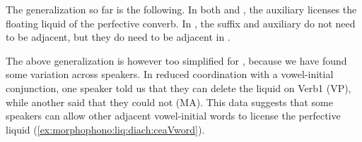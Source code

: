 The generalization so far is the following. In both {\iaIA} and {\seaCEA}, the auxiliary licenses the floating liquid of the perfective converb. In {\iaIA}, the suffix and auxiliary do not need to be adjacent, but they do need to be adjacent in {\seaCEA}.%
%
%	
%			
%			
%		

The above generalization  is however too simplified for   {\seaCEA}, because we have found some variation across speakers. In reduced coordination with a vowel-initial conjunction, one {\seaSE} speaker  told us that they can delete the liquid on Verb1 (VP), while another said that they could not (MA). This data suggests that some speakers can allow other adjacent vowel-initial words to license the perfective liquid (\ref{ex:morphophono:liq:diach:ceaVword}). 



